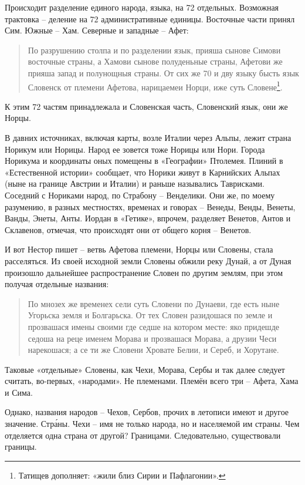 Происходит разделение единого народа, языка, на 72 отдельных. Возможная трактовка – деление на 72 административные единицы. Восточные части принял Сим. Южные – Хам. Северные и западные – Афет:

\begin{quotation}
По разрушению столпа и по разделении язык, прияша сынове Симови восточные страны, а Хамови сынове полуденьные страны, Афетови же прияша запад и полунощныя страны. От сих же 70 и дву языку бысть язык Словенск от племени Афетова, нарицаемеи Норци, иже суть Словене\footnote{Татищев дополняет: «жили близ Сирии и Пафлагонии».}.
\end{quotation}

К этим 72 частям принадлежала и Словенская часть, Словенский язык, они же Норцы.

В давних источниках, включая карты, возле Италии через Альпы, лежит страна Норикум или Норицы. Народ ее зовется тоже Норицы или Нори. Города Норикума и координаты оных помещены в «Географии» Птолемея. Плиний в «Естественной истории» сообщает, что Норики живут в Карнийских Альпах (ныне на границе Австрии и Италии) и раньше назывались Таврисками. Соседний с Нориками народ, по Страбону – Венделики. Они же, по моему разумению, в разных местностях, временах и говорах – Венеды, Венды, Венеты, Ванды, Энеты, Анты. Иордан в «Гетике», впрочем, разделяет Венетов, Антов и Склавенов, отмечая, что происходят они от общего корня – Венетов.

И вот Нестор пишет – ветвь Афетова племени, Норцы или Словены, стала расселяться. Из своей исходной земли Словены обжили реку Дунай, а от Дуная произошло дальнейшее распространение Словен по другим землям, при этом получая отдельные названия:

\begin{quotation}
По мнозех же временех сели суть Словени по Дунаеви, где есть ныне Угорьска земля и Болгарьска. От тех Словен разидошася по земле и прозвашася имены своими где седше на котором месте: яко придешде седоша на реце именем Морава и прозвашася Морава, а друзии Чеси нарекошася; а се ти же Словени Хровате Белии, и Сереб, и Хорутане. 
\end{quotation}

Таковые «отдельные» Словены, как Чехи, Морава, Сербы и так далее следует считать, во-первых, «народами». Не племенами. Племён всего три – Афета, Хама и Сима.

Однако, названия народов – Чехов, Сербов, прочих в летописи имеют и другое значение. Стр\'аны. Чехи – имя не только народа, но и населяемой им страны. Чем отделяется одна страна от другой? Границами. Следовательно, существовали границы.

